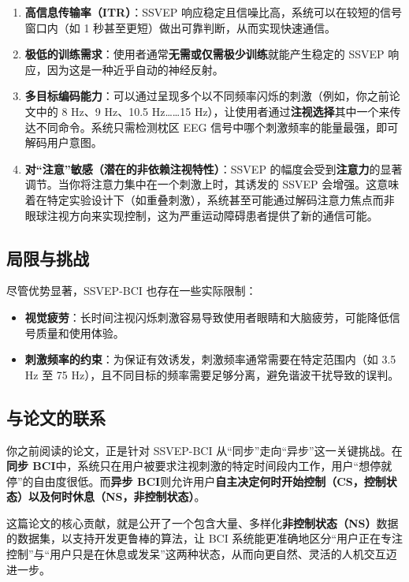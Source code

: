 \documentclass[12pt, a4paper]{ctexart}
\begin{document}
\begin{enumerate}
  \item \textbf{高信息传输率（ITR）}：SSVEP 响应稳定且信噪比高，系统可以在较短的信号窗口内（如 1 秒甚至更短）做出可靠判断，从而实现快速通信。
  \item \textbf{极低的训练需求}：使用者通常\textbf{无需或仅需极少训练}就能产生稳定的 SSVEP 响应，因为这是一种近乎自动的神经反射。
  \item \textbf{多目标编码能力}：可以通过呈现多个以不同频率闪烁的刺激（例如，你之前论文中的 8 Hz、9 Hz、10.5 Hz……15 Hz），让使用者通过\textbf{注视选择}其中一个来传达不同命令。系统只需检测枕区 EEG 信号中哪个刺激频率的能量最强，即可解码用户意图。
  \item \textbf{对``注意''敏感（潜在的非依赖注视特性）}：SSVEP 的幅度会受到\textbf{注意力}的显著调节。当你将注意力集中在一个刺激上时，其诱发的 SSVEP 会增强。这意味着在特定实验设计下（如重叠刺激），系统甚至可能通过解码注意力焦点而非眼球注视方向来实现控制，这为严重运动障碍患者提供了新的通信可能。
\end{enumerate}

\subsection{局限与挑战}

尽管优势显著，SSVEP-BCI 也存在一些实际限制：

\begin{itemize}
  \item \textbf{视觉疲劳}：长时间注视闪烁刺激容易导致使用者眼睛和大脑疲劳，可能降低信号质量和使用体验。
  \item \textbf{刺激频率的约束}：为保证有效诱发，刺激频率通常需要在特定范围内（如 3.5 Hz 至 75 Hz），且不同目标的频率需要足够分离，避免谐波干扰导致的误判。
\end{itemize}

\subsection{与论文的联系}

你之前阅读的论文，正是针对 SSVEP-BCI 从``同步''走向``异步''这一关键挑战。在\textbf{同步 BCI}中，系统只在用户被要求注视刺激的特定时间段内工作，用户``想停就停''的自由度很低。而\textbf{异步 BCI}则允许用户\textbf{自主决定何时开始控制（CS，控制状态）以及何时休息（NS，非控制状态）}。

这篇论文的核心贡献，就是公开了一个包含大量、多样化\textbf{非控制状态（NS）}数据的数据集，以支持开发更鲁棒的算法，让 BCI 系统能更准确地区分``用户正在专注控制''与``用户只是在休息或发呆''这两种状态，从而向更自然、灵活的人机交互迈进一步。
\end{document}
